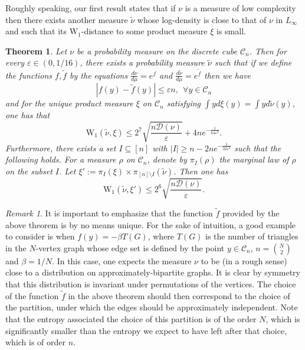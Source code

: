 \documentclass[12pt]{article}
\def \W{\mathrm{W_1}}
\def \eps {\varepsilon}
\def \DC {\mathcal{C}_n}
\def \Comp { \mathcal{D} }
\newtheorem{theorem}{Theorem}
\theoremstyle{definition}
\theoremstyle{remark}
\newtheorem{remark}{Remark}
\begin{document}
Roughly speaking, our first result states that if $\nu$ is a measure of low complexity then there exists another measure $\tilde \nu$ whose log-density is close to that of $\nu$ in $L_\infty$ and such that its $\W$-distance to some product measure $\xi$ is small. 
\begin{theorem} \label{thm:main}
Let $\nu$ be a probability measure on the discrete cube $\DC$. Then for every {\small $\eps \in \left (0, 1/16 \right )$}, there exists a probability measure
$\tilde \nu$ such that if we define the functions $f,\tilde f$ by the equations $\frac{d \nu}{d \mu} = e^{f}$ and $\frac{d \tilde \nu}{d \mu} = e^{\tilde f}$ then we have
\begin{equation}\label{eq:ftildef}
|f(y) - \tilde f(y)| \leq \eps n, ~~ \forall y \in \DC
\end{equation}
and for the unique \emph{product} measure $\xi$ on $\DC$ satisfying $\int y d\xi(y) = \int y d \tilde \nu(y)$, one has that
$$
\W(\tilde \nu, \xi) \leq 2^7 \sqrt{\frac{n \Comp(\nu)}{\eps}} + 4 n e^{-\frac{1}{64 \eps^2}}.
$$
Furthermore, there exists a set $I \subseteq [n]$ with $|I| \geq n - 2 n e^{-\frac{1}{32 \eps^2}}$ such that the following holds. For a measure $\rho$ on $\DC$, denote by $\pi_I (\rho)$ the marginal law of $\rho$ on the subset $I$. Let $\xi' := \pi_I(\xi) \times \pi_{[n] \setminus I}(\tilde \nu)$. Then one has
$$
\W(\tilde \nu, \xi') \leq 2^6 \sqrt{\frac{n \Comp(\nu)}{\eps}}.
$$
\end{theorem}

\begin{remark} 
It is important to emphasize that the function $\tilde f$ provided by the above theorem is by no means unique. For the sake of intuition, a good example to consider is when $f(y) = - \beta T(G)$, where $T(G)$ is the number of triangles in the $N$-vertex graph whose edge set is defined by the point $y \in \DC$, $n = {N \choose 2}$ and $\beta = 1/N$. In this case, one expects the measure $\nu$ to be (in a rough sense) close to a distribution on approximately-bipartite graphs. It is clear by symmetry that this distribution is invariant under permutations of the vertices. The choice of the function $\tilde f$ in the above theorem should then correspond to the choice of the partition, under which the edges should be approximately independent. Note that the entropy associated the choice of this partition is of the order $N$, which is significantly smaller than the entropy we expect to have left after that choice, which is of order $n$.
\end{remark}
\end{document}
